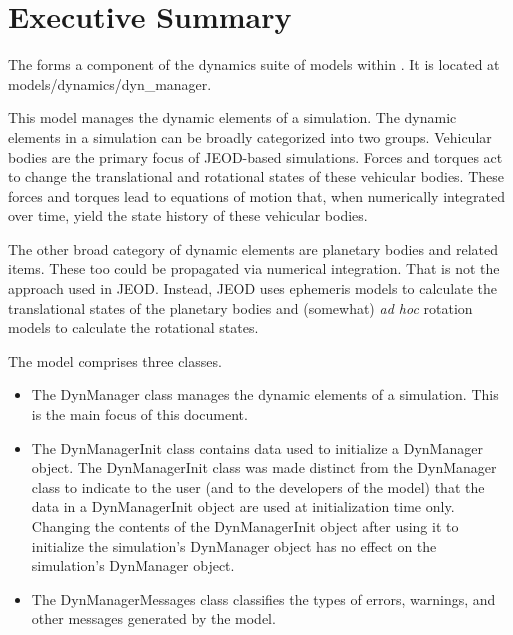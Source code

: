 %
%

\chapter*{Executive Summary}

The \ModelDesc forms a component of the dynamics suite of
models within \JEODid. It is located at
models/dynamics/dyn\_manager.

This model manages the dynamic elements of a simulation.
The dynamic elements in a simulation can be broadly categorized into two groups.
Vehicular bodies are the primary focus of JEOD-based simulations.
Forces and torques act to change the translational and rotational states
of these vehicular bodies. These forces and torques lead to equations of
motion that, when numerically integrated over time, yield the state history
of these vehicular bodies.

The other broad category of dynamic elements are planetary bodies and
related items. These too could be propagated via numerical integration.
That is not the approach used in JEOD. Instead, JEOD uses ephemeris models
to calculate the translational states of the planetary bodies and
(somewhat) \emph{ad hoc} rotation models to calculate the rotational states.

The model comprises three classes.\begin{itemize}
\item The DynManager class manages the dynamic elements of a simulation.
This is the main focus of this document.
\item The DynManagerInit class contains data used to initialize a DynManager
object. The DynManagerInit class was made distinct from the DynManager class
to indicate to the user (and to the developers of the model) that the
data in a DynManagerInit object are used at initialization time only.
Changing the contents of the DynManagerInit object after using it to
initialize the simulation's DynManager object has no effect on the
simulation's DynManager object.
\item The DynManagerMessages class classifies the types of errors, warnings,
and other messages generated by the model.
\end{itemize}

